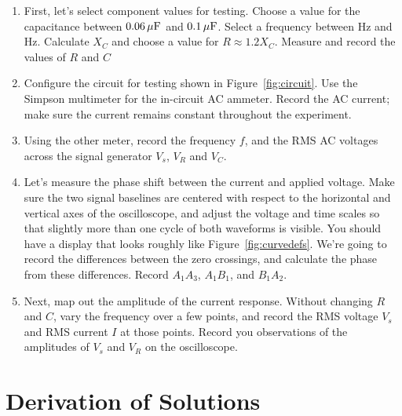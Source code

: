 \documentclass[12pt]{article}
\begin{document}
\begin{enumerate}
\item First, let's select component values for testing.  Choose a
  value for the capacitance between $\unit[0.06]{\mu F}$ and
  $\unit[0.1]{\mu F}$.  Select a frequency between \unit[300]{Hz} and
  \unit[600]{Hz}.  Calculate $X_C$ and choose a value for $R \approx
  1.2 X_C$.  Measure and record the values of $R$ and $C$
\item Configure the circuit for testing shown in
  Figure~\ref{fig:circuit}.  Use the Simpson multimeter for the
  in-circuit AC ammeter.  Record the AC current; make sure the current
  remains constant throughout the experiment.
\item Using the other meter, record the frequency $f$, and the RMS AC
  voltages across the signal generator $V_s$, $V_R$ and $V_C$.
\item \label{item:phase} Let's measure the phase shift between the
  current and applied voltage.  Make sure the two signal baselines are
  centered with respect to the horizontal and vertical axes of the
  oscilloscope, and adjust the voltage and time scales so that
  slightly more than one cycle of both waveforms is visible.  You
  should have a display that looks roughly like
  Figure~\ref{fig:curvedefs}.  We're going to record the differences
  between the zero crossings, and calculate the phase from these
  differences.  Record $A_1A_3$, $A_1B_1$, and $B_1A_2$.
\item Next, map out the amplitude of the current response.  Without
  changing $R$ and $C$, vary the frequency over a few points, and
  record the RMS voltage $V_s$ and RMS current $I$ at those points.
  Record you observations of the amplitudes of $V_s$ and $V_R$ on the
  oscilloscope. 
\end{enumerate}

\appendix

\section{Derivation of Solutions}
\label{sec:solutions}
\end{document}

